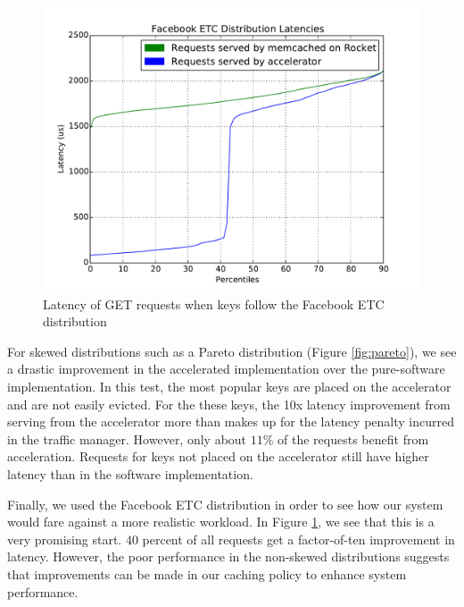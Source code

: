 \begin{figure}[t]
\begin{center}
\includegraphics[width=\linewidth]{etc.pdf}
\caption{Latency of GET requests when keys follow the Facebook ETC distribution}
\label{fig:etc}
\end{center}
\end{figure}

For skewed distributions such as a Pareto distribution (Figure \ref{fig:pareto}),
we see a drastic improvement in the accelerated implementation over the
pure-software implementation. In this test, the most popular keys are placed
on the accelerator and are not easily evicted. For the these keys, the 10x
latency improvement from serving from the accelerator more than makes up
for the latency penalty incurred in the traffic manager. However, only about
$11\%$ of the requests benefit from acceleration. Requests for keys not placed
on the  accelerator still have higher latency than in the software implementation.

Finally, we used the Facebook ETC distribution \cite{AXFJP2012} in order to see
how our system would fare against a more realistic workload. In Figure
\ref{fig:etc}, we see that this is a very promising start. $40$ percent of all
requests get a factor-of-ten improvement in latency. However, the poor
performance in the non-skewed distributions suggests that improvements can be
made in our caching policy to enhance system performance.
